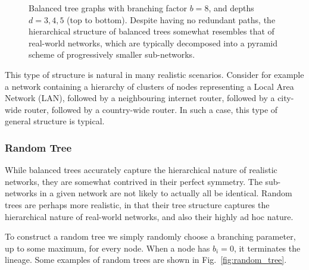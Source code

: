 \documentclass[aps,rmp,twocolumn,amsmath,amssymb,nofootinbib,superscriptaddress]{revtex4}
\begin{document}
\begin{figure}[!htb]
\caption{Balanced tree graphs with branching factor $b=8$, and depths $d=3,4,5$ (top to bottom). Despite having no redundant paths, the hierarchical structure of balanced trees somewhat resembles that of real-world networks, which are typically decomposed into a pyramid scheme of progressively smaller sub-networks.} \label{fig:tree_example}
\end{figure}

This type of structure is natural in many realistic scenarios. Consider for example a network containing a hierarchy of clusters of nodes representing a Local Area Network (LAN), followed by a neighbouring internet router, followed by a city-wide router, followed by a country-wide router. In such a case, this type of general structure is typical.

%
%

\subsubsection{Random Tree}

While balanced trees accurately capture the hierarchical nature of realistic networks, they are somewhat contrived in their perfect symmetry. The sub-networks in a given network are not likely to actually all be identical. Random trees are perhaps more realistic, in that their tree structure captures the hierarchical nature of real-world networks, and also their highly ad hoc nature.

To construct a random tree we simply randomly choose a branching parameter, up to some maximum, for every node. When a node has \mbox{$b_i=0$}, it terminates the lineage. Some examples of random trees are shown in Fig.~\ref{fig:random_tree}.
\end{document}
